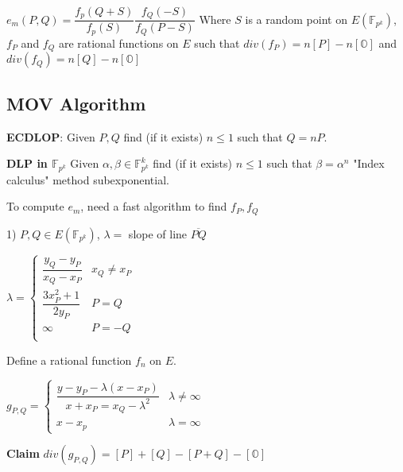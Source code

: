 \documentclass[10pt]{article}
\newcommand{\F}{\mathbb{F}}
\renewcommand{\O}{\mathbb{O}}
\begin{document}
$e_m(P, Q) = \dfrac{f_p(Q + S)}{f_p(S)}\dfrac{f_Q(-S)}{f_Q(P-S)}$ Where $S$ is a random point on $E(\F_{p^k})$, $f_P$ and $f_Q$ are rational functions on $E$ such that $div(f_P) = n[P] - n[\O]$ and $div(f_Q) = n[Q] - n[\O]$

\subsection{MOV Algorithm}
\textbf{ECDLOP}: Given $P, Q$ find (if it exists) $n \leq 1$ such that $Q = nP$.

\textbf{DLP in $\F_{p^k}$} Given $\alpha, \beta \in \F_{p^k}^k$ find (if it exists) $n \leq 1$ such that $\beta = \alpha^n$ "Index calculus" method subexponential.

To compute $e_m$, need a fast algorithm to find $f_P, f_Q$

1) $P, Q \in E(\F_{p^k})$, $\lambda =$ slope of line $\overline{PQ}$

$\lambda = \begin{cases}
    \dfrac{y_Q - y_P}{x_Q - x_P} & x_Q \neq x_P\\
    \dfrac{3x_P^2 + 1}{2y_P} & P = Q\\
    \infty & P = -Q\\
\end{cases}$

Define a rational function $f_n$ on $E$.

$g_{P, Q} = \begin{cases}
        \dfrac{y - y_P - \lambda(x - x_P)}{x + x_P = x_Q - \lambda^2} & \lambda \neq \infty\\
        x- x_p & \lambda = \infty
\end{cases}$

\textbf{Claim} $div(g_{P, Q}) = [P] + [Q] - [P + Q] - [\O]$
\end{document}
